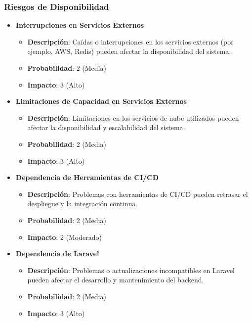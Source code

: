 \subsubsection{Riesgos de Disponibilidad}

\begin{itemize}
    \item \textbf{Interrupciones en Servicios Externos}
          \begin{itemize}
              \item \textbf{Descripción}: Caídas o interrupciones en los servicios externos (por ejemplo, AWS, Redis) pueden afectar la disponibilidad del sistema.
              \item \textbf{Probabilidad}: 2 (Media)
              \item \textbf{Impacto}: 3 (Alto)
          \end{itemize}

    \item \textbf{Limitaciones de Capacidad en Servicios Externos}
          \begin{itemize}
              \item \textbf{Descripción}: Limitaciones en los servicios de nube utilizados pueden afectar la disponibilidad y escalabilidad del sistema.
              \item \textbf{Probabilidad}: 2 (Media)
              \item \textbf{Impacto}: 3 (Alto)
          \end{itemize}

    \item \textbf{Dependencia de Herramientas de CI/CD}
          \begin{itemize}
              \item \textbf{Descripción}: Problemas con herramientas de CI/CD pueden retrasar el despliegue y la integración continua.
              \item \textbf{Probabilidad}: 2 (Media)
              \item \textbf{Impacto}: 2 (Moderado)
          \end{itemize}

    \item \textbf{Dependencia de Laravel}
          \begin{itemize}
              \item \textbf{Descripción}: Problemas o actualizaciones incompatibles en Laravel pueden afectar el desarrollo y mantenimiento del backend.
              \item \textbf{Probabilidad}: 2 (Media)
              \item \textbf{Impacto}: 3 (Alto)
          \end{itemize}


\end{itemize}
